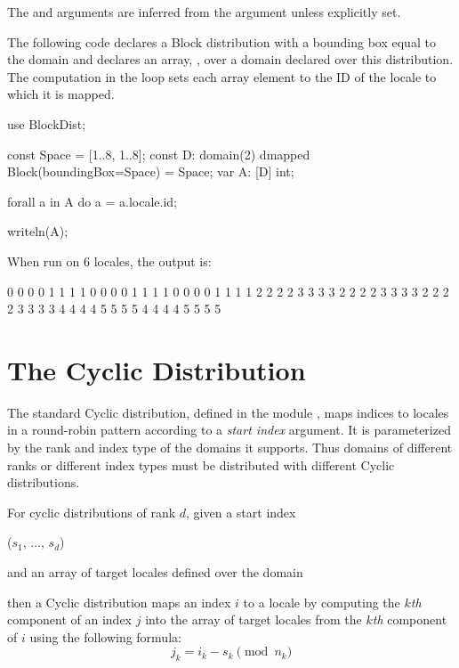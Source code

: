 The  and  arguments are inferred from the
 argument unless explicitly set.

\begin{example}
The following code declares a Block distribution with a bounding box
equal to the domain  and declares an array, , over
a domain declared over this distribution.  The computation in
the  loop sets each array element to the ID of the locale
to which it is mapped.
\begin{chapel}
use BlockDist;

const Space = [1..8, 1..8];
const D: domain(2) dmapped Block(boundingBox=Space) = Space;
var A: [D] int;

forall a in A do
  a = a.locale.id;

writeln(A);
\end{chapel}
When run on 6 locales, the output is:
\begin{chapel}
0 0 0 0 1 1 1 1
0 0 0 0 1 1 1 1
0 0 0 0 1 1 1 1
2 2 2 2 3 3 3 3
2 2 2 2 3 3 3 3
2 2 2 2 3 3 3 3
4 4 4 4 5 5 5 5
4 4 4 4 5 5 5 5
\end{chapel}
\end{example}


\section{The Cyclic Distribution}
\label{Cyclic_Dist}
The standard Cyclic distribution, defined in the
module , maps indices to locales in a round-robin
pattern according to a \emph{start index} argument.  It is
parameterized by the rank and index type of the domains it supports.
Thus domains of different ranks or different index types must be
distributed with different Cyclic distributions.

For cyclic distributions of rank $d$, given a start index
\begin{chapel}
($s_1$, $\ldots$, $s_d$)
\end{chapel}
and an array of target locales defined over the domain
\begin{chapel}
[$0$..$n_1$-1, $\ldots$, $0$..$n_d$-1]
\end{chapel}
then a Cyclic distribution maps an index $i$ to a locale by computing
the $k$\emph{th} component of an index $j$ into the array of target
locales from the $k$\emph{th} component of $i$ using the following
formula:
\[j_k = i_k - s_k \pmod{n_k}\]

